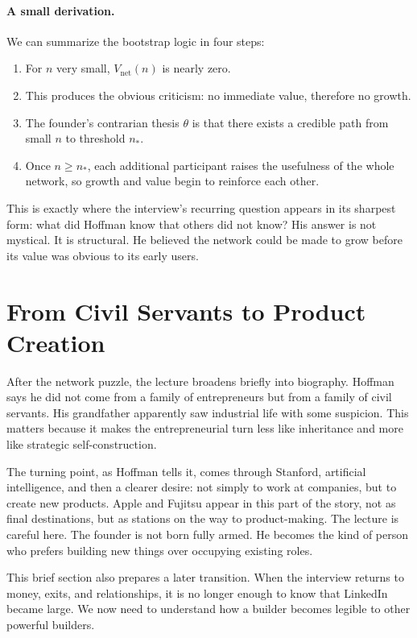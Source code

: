 \paragraph{A small derivation.}
We can summarize the bootstrap logic in four steps:
\begin{enumerate}
\item For \(n\) very small, \(V_{\mathrm{net}}(n)\) is nearly zero.
\item This produces the obvious criticism: no immediate value, therefore no growth.
\item The founder's contrarian thesis \(\theta\) is that there exists a credible path from small \(n\) to threshold \(n_\ast\).
\item Once \(n\geq n_\ast\), each additional participant raises the usefulness of the whole network, so growth and value begin to reinforce each other.
\end{enumerate}

This is exactly where the interview's recurring question appears in its sharpest form: what did Hoffman know that others did not know? His answer is not mystical. It is structural. He believed the network could be made to grow before its value was obvious to its early users.

\section{From Civil Servants to Product Creation}

After the network puzzle, the lecture broadens briefly into biography. Hoffman says he did not come from a family of entrepreneurs but from a family of civil servants. His grandfather apparently saw industrial life with some suspicion. This matters because it makes the entrepreneurial turn less like inheritance and more like strategic self-construction.

The turning point, as Hoffman tells it, comes through Stanford, artificial intelligence, and then a clearer desire: not simply to work at companies, but to create new products. Apple and Fujitsu appear in this part of the story, not as final destinations, but as stations on the way to product-making. The lecture is careful here. The founder is not born fully armed. He becomes the kind of person who prefers building new things over occupying existing roles.

This brief section also prepares a later transition. When the interview returns to money, exits, and relationships, it is no longer enough to know that LinkedIn became large. We now need to understand how a builder becomes legible to other powerful builders.

